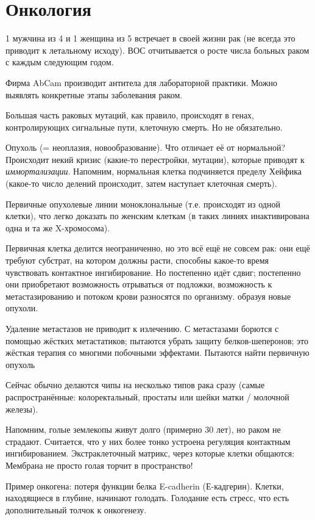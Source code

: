 \documentclass[main.tex]{subfiles}
\begin{document}
	\section{Онкология}
	1 мужчина из 4 и 1 женщина из 5 встречает в своей жизни рак (не всегда это приводит к летальному исходу).
	ВОС отчитывается о росте числа больных раком с каждым следующим годом.
	
	Фирма AbCam производит антитела для лабораторной практики.
	Можно выявлять конкретные этапы заболевания раком.
	
	Большая часть раковых мутаций, как правило, происходят в генах, контролирующих сигнальные пути, клеточную смерть.
	Но не обязательно.
	
	Опухоль (= неоплазия, новообразование).
	Что отличает её от нормальной?
	Происходит некий кризис (какие-то перестройки, мутации), которые приводят к \emph{иммортализации}.
	Напомним, нормальная клетка подчиняется пределу Хейфика (какое-то число делений происходит, затем наступает клеточная смерть).
	
	Первичные опухолевые линии моноклональные (т.е. происходят из одной клетки), что легко доказать по женским клеткам (в таких линиях инактивирована одна и та же X-хромосома).
	
	Первичная клетка делится неограниченно, но это всё ещё не совсем рак: они ещё требуют субстрат, на котором должны расти, способны какое-то время чувствовать контактное ингибирование.
	Но постепенно идёт сдвиг; постепенно они приобретают возможность отрываться от подложки, возможность к метастазированию и потоком крови разносятся по организму. образуя новые опухоли.
	
	Удаление метастазов не приводит к излечению.
	С метастазами борются с помощью жёстких метастатиков; пытаются убрать защиту белков-шеперонов; это жёсткая терапия со многими побочными эффектами.
	Пытаются найти первичную опухоль
	
	Сейчас обычно делаются чипы на несколько типов рака сразу (самые распространённые: колоректальный, простаты или шейки матки / молочной железы).
	
	Напомним, голые землекопы живут долго (примерно 30 лет), но раком не страдают.
	Считается, что у них более тонко устроена регуляция контактным ингибированием.
	Экстраклеточный матрикс, через которые клетки общаются: %
	Мембрана не просто голая торчит в пространство!
	
Пример онкогена: потеря функции белка E-cadherin (Е-кадгерин).
Клетки, находящиеся в глубине, начинают голодать.
Голодание есть стресс, что есть дополнительный толчок к онкогенезу.
\end{document}
